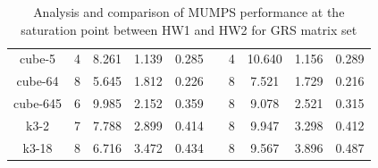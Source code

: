\begin{table}[htpb]
\begin{tabular}{c|c|c|c|c|c|c|c|c|c|}
\multicolumn{1}{|c|}{cube-5}                                                & 4   & 8.261                                                              & 1.139                                              & 0.285                                                  & \multicolumn{1}{c|}{} & 4   & 10.640                                                             & 1.156                                              & 0.289                                                  \\ \cline{1-5} \cline{7-10} 
\multicolumn{1}{|c|}{cube-64}                                               & 8   & 5.645                                                              & 1.812                                              & 0.226                                                  & \multicolumn{1}{c|}{} & 8   & 7.521                                                              & 1.729                                              & 0.216                                                  \\ \cline{1-5} \cline{7-10} 
\multicolumn{1}{|c|}{cube-645}                                              & 6   & 9.985                                                              & 2.152                                              & 0.359                                                  & \multicolumn{1}{c|}{} & 8   & 9.078                                                              & 2.521                                              & 0.315                                                  \\ \cline{1-5} \cline{7-10} 
\multicolumn{1}{|c|}{k3-2}                                                  & 7   & 7.788                                                              & 2.899                                              & 0.414                                                  & \multicolumn{1}{c|}{} & 8   & 9.947                                                              & 3.298                                              & 0.412                                                  \\ \cline{1-5} \cline{7-10} 
\multicolumn{1}{|c|}{k3-18}                                                 & 8   & 6.716                                                              & 3.472                                              & 0.434                                                  & \multicolumn{1}{c|}{} & 8   & 9.567                                                              & 3.896                                              & 0.487                                                  \\ \cline{1-5} \cline{7-10} 
\end{tabular}
\caption{Analysis and comparison of MUMPS performance at the saturation point between HW1 and HW2 for GRS matrix set}
\label{table:pinning-comparison-grs-matrix-set}
\end{table}



